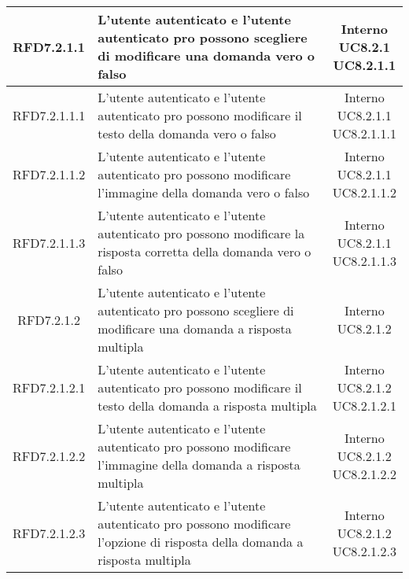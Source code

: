 \begin{longtable}{|c|>{\centering}m{7cm}|c|}
			 \hypertarget{{RFD7.2.1.1}}{{RFD7.2.1.1}} & L’utente autenticato e l’utente autenticato pro possono scegliere di modificare una domanda vero o falso & \makecell{Interno\\ UC8.2.1 \\UC8.2.1.1 } \\ \hline
			 \hypertarget{{RFD7.2.1.1.1}}{{RFD7.2.1.1.1}} & L’utente autenticato e l'utente autenticato pro possono modificare il testo della domanda vero o falso & \makecell{Interno\\ UC8.2.1.1 \\UC8.2.1.1.1 } \\ \hline
			 \hypertarget{{RFD7.2.1.1.2}}{{RFD7.2.1.1.2}} & L’utente autenticato e l'utente autenticato pro possono modificare l’immagine della domanda vero o falso & \makecell{Interno\\ UC8.2.1.1 \\UC8.2.1.1.2 } \\ \hline
			 \hypertarget{{RFD7.2.1.1.3}}{{RFD7.2.1.1.3}} & L’utente autenticato e l'utente autenticato pro possono modificare la risposta corretta della domanda vero o falso & \makecell{Interno\\ UC8.2.1.1 \\UC8.2.1.1.3 } \\ \hline
			 \hypertarget{{RFD7.2.1.2}}{{RFD7.2.1.2}} & L’utente autenticato e l’utente autenticato pro possono scegliere di modificare una domanda a risposta multipla & \makecell{Interno\\ UC8.2.1.2 } \\ \hline
			 \hypertarget{{RFD7.2.1.2.1}}{{RFD7.2.1.2.1}} & L’utente autenticato e l'utente autenticato pro possono modificare il testo della domanda a risposta multipla & \makecell{Interno\\ UC8.2.1.2 \\UC8.2.1.2.1 } \\ \hline
			 \hypertarget{{RFD7.2.1.2.2}}{{RFD7.2.1.2.2}} & L’utente autenticato e l'utente autenticato pro possono modificare l’immagine della domanda a risposta multipla & \makecell{Interno\\ UC8.2.1.2 \\UC8.2.1.2.2 } \\ \hline
			 \hypertarget{{RFD7.2.1.2.3}}{{RFD7.2.1.2.3}} & L’utente autenticato e l'utente autenticato pro possono modificare l’opzione di risposta della domanda a risposta multipla & \makecell{Interno\\ UC8.2.1.2 \\UC8.2.1.2.3 } \\ \hline

\end{longtable}
